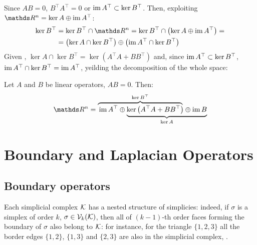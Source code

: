 Since \( A B = 0\), \( B^\top A^\top = 0 \) or \( \operatorname{im} A^\top \subset \ker B^\top \). Then, exploiting \( \ds R^n = \ker A \oplus \im A^\top \): 
\begin{equation}
      \begin{aligned}
            \ker B^\top & = \ker B^\top \cap \ds R^n = \ker B^\top \cap \left( \ker A \oplus \im A^\top \right) = \\
            & = \left( \ker A \cap \ker B^\top \right) \oplus \left( \im A^\top \cap \ker B^\top \right)
      \end{aligned}
\end{equation}
Given , \( \ker A \cap \ker B^\top = \ker \left(  A^\top A + B B^\top \right) \) and, since \( \operatorname{im} A^\top \subset \ker B^\top \), \( \operatorname{im} A^\top \cap \ker B^\top = \operatorname{im} A^\top \), yeilding the decomposition of  the whole space:
\begin{theorem}\label{thm:hodge_decomposition}
      Let \( A \) and \( B \) be linear operators, \( A B = 0 \). Then:
      \begin{equation}
            \ds R^n = \lefteqn{\overbrace{\phantom{\im A^\top \oplus  \ker \left( A^\top A + B B^\top \right)}}^{\ker B^\top}} \im A^\top \oplus
            \underbrace{\ker \left( A^\top A + B B^\top \right) \oplus  \im B}_{\ker A}
      \end{equation}
      \vspace{-\baselineskip}
\end{theorem}





\section{ Boundary and Laplacian Operators }

\subsection{Boundary operators}

Each simplicial complex \( \mathcal{K} \) has a nested structure of simplicies: indeed, if \( \sigma \) is a simplex of order \( k \), \( \sigma \in \mathcal{V}_{k}(\mathcal{K}) \), then all of \( (k-1)\)-th order faces forming the boundary of \( \sigma \) also belong to \( \mathcal{K} \): for instance, for the triangle \( \{ 1, 2, 3  \} \) all the border edges \( \{ 1, 2\} \), \( \{ 1, 3\}\) and \( \{ 2, 3 \}\) are also in the simplicial complex, . 


